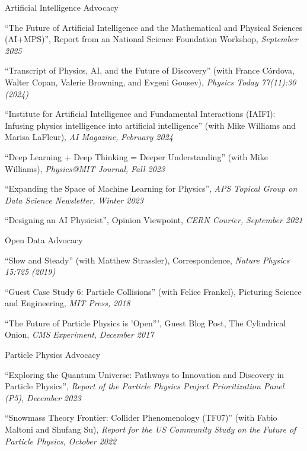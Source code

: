 \item Artificial Intelligence Advocacy 
\bsbl 
\item ``The Future of Artificial Intelligence and the Mathematical and Physical Sciences (AI+MPS)'', Report from an National Science Foundation Workshop, \emph{September 2025}
\item ``Transcript of Physics, AI, and the Future of Discovery'' (with France Córdova, Walter Copan, Valerie Browning, and Evgeni Gousev), \emph{Physics Today 77(11):30 (2024)}
\item ``Institute for Artificial Intelligence and Fundamental Interactions (IAIFI): Infusing physics intelligence into artificial intelligence'' (with Mike Williams and Marisa LaFleur), \emph{AI Magazine,} \emph{February 2024}
\item ``Deep Learning + Deep Thinking = Deeper Understanding'' (with Mike Williams), \emph{Physics@MIT Journal,} \emph{Fall 2023}
\item ``Expanding the Space of Machine Learning for Physics'', \emph{APS Topical Group on Data Science Newsletter,} \emph{Winter 2023}
\item ``Designing an AI Physicist'', Opinion Viewpoint, \emph{CERN Courier,} \emph{September 2021}
\el 
\item Open Data Advocacy 
\bsbl 
\item ``Slow and Steady'' (with Matthew Strassler), Correspondence, \emph{Nature Physics 15:725 (2019)}
\item ``Guest Case Study 6:  Particle Collisions'' (with Felice Frankel), Picturing Science and Engineering, \emph{MIT Press,} \emph{2018}
\item ``The Future of Particle Physics is 'Open''', Guest Blog Post, The Cylindrical Onion, \emph{CMS Experiment,} \emph{December 2017}
\el 
\item Particle Physics Advocacy 
\bsbl 
\item ``Exploring the Quantum Universe: Pathways to Innovation and Discovery in Particle Physics'', \emph{Report of the Particle Physics Project Prioritization Panel (P5),} \emph{December 2023}
\item ``Snowmass Theory Frontier:  Collider Phenomenology (TF07)'' (with Fabio Maltoni and Shufang Su), \emph{Report for the US Community Study on the Future of Particle Physics,} \emph{October 2022}
\el 
